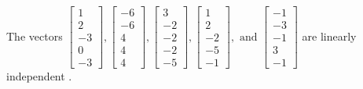 \begin{exercise}
\begin{exerciseStatement}
  \end{exerciseStatement}
  \begin{exerciseAnswer}
   The vectors \(\left[\begin{array}{r}
1 \\
2 \\
-3 \\
0 \\
-3
\end{array}\right] , \left[\begin{array}{r}
-6 \\
-6 \\
4 \\
4 \\
4
\end{array}\right] , \left[\begin{array}{r}
3 \\
-2 \\
-2 \\
-2 \\
-5
\end{array}\right] , \left[\begin{array}{r}
1 \\
2 \\
-2 \\
-5 \\
-1
\end{array}\right] , \text{ and } \left[\begin{array}{r}
-1 \\
-3 \\
-1 \\
3 \\
-1
\end{array}\right]\) are 
  	 linearly independent  .
  


  \end{exerciseAnswer}
\end{exercise}